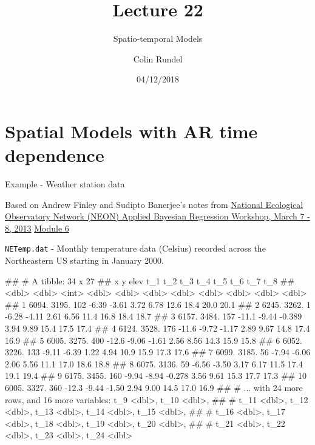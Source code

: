 \documentclass[11pt,ignorenonframetext,]{beamer}
\title{Lecture 22}
\subtitle{Spatio-temporal Models}
\author{Colin Rundel}
\date{04/12/2018}
\let\oldShaded\Shaded
\let\endoldShaded\endShaded
\let\oldverbatim\verbatim
\let\endoldverbatim\endverbatim
\renewenvironment{verbatim}{\footnotesize\begin{spacing}{0.9}\oldverbatim}{\endoldverbatim\end{spacing}}
\newcommand{\scriptoutput}{
  \renewenvironment{Shaded}{\scriptsize\begin{spacing}{0.9}\oldShaded}{\endoldShaded\end{spacing}}
  \renewenvironment{verbatim}{\scriptsize\begin{spacing}{0.9}\oldverbatim}{\endoldverbatim\end{spacing}}
}
\begin{document}
\frame{\titlepage}

\hypertarget{spatial-models-with-ar-time-dependence}{%
\section{Spatial Models with AR time
dependence}\label{spatial-models-with-ar-time-dependence}}

\begin{frame}[fragile]{Example - Weather station data}
\protect\hypertarget{example---weather-station-data}{}

\footnotesize

Based on Andrew Finley and Sudipto Banerjee’s notes from
\href{http://blue.for.msu.edu/NEON/SC/}{National Ecological Observatory
Network (NEON) Applied Bayesian Regression Workshop, March 7 - 8, 2013}
\href{http://blue.for.msu.edu/NEON/SC/exercises/exercise-6/initial-exploration-spDynLM.pdf}{Module
6}

\texttt{NETemp.dat} - Monthly temperature data (Celsius) recorded across
the Northeastern US starting in January 2000.

\scriptoutput

\begin{verbatim}
## # A tibble: 34 x 27
##        x     y  elev    t_1   t_2    t_3   t_4   t_5   t_6   t_7   t_8
##    <dbl> <dbl> <int>  <dbl> <dbl>  <dbl> <dbl> <dbl> <dbl> <dbl> <dbl>
##  1 6094. 3195.   102  -6.39 -3.61  3.72   6.78 12.6   18.4  20.0  20.1
##  2 6245. 3262.     1  -6.28 -4.11  2.61   6.56 11.4   16.8  18.4  18.7
##  3 6157. 3484.   157 -11.1  -9.44 -0.389  3.94  9.89  15.4  17.5  17.4
##  4 6124. 3528.   176 -11.6  -9.72 -1.17   2.89  9.67  14.8  17.4  16.9
##  5 6005. 3275.   400 -12.6  -9.06 -1.61   2.56  8.56  14.3  15.9  15.8
##  6 6052. 3226.   133  -9.11 -6.39  1.22   4.94 10.9   15.9  17.3  17.6
##  7 6099. 3185.    56  -7.94 -6.06  2.06   5.56 11.1   17.0  18.6  18.8
##  8 6075. 3136.    59  -6.56 -3.50  3.17   6.17 11.5   17.4  19.1  19.4
##  9 6175. 3455.   160  -9.94 -8.94 -0.278  3.56  9.61  15.3  17.7  17.3
## 10 6005. 3327.   360 -12.3  -9.44 -1.50   2.94  9.00  14.5  17.0  16.9
## # ... with 24 more rows, and 16 more variables: t_9 <dbl>, t_10 <dbl>,
## #   t_11 <dbl>, t_12 <dbl>, t_13 <dbl>, t_14 <dbl>, t_15 <dbl>,
## #   t_16 <dbl>, t_17 <dbl>, t_18 <dbl>, t_19 <dbl>, t_20 <dbl>,
## #   t_21 <dbl>, t_22 <dbl>, t_23 <dbl>, t_24 <dbl>
\end{verbatim}

\end{frame}
\end{document}
